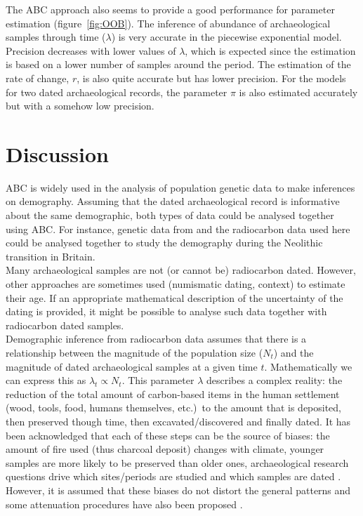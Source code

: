 \documentclass[a4paper]{article}
\begin{document}
The ABC approach also seems to provide a good performance for parameter estimation (figure~\ref{fig:OOB}). The inference of abundance of archaeological samples through time ($\lambda$) is very accurate in the piecewise exponential model. Precision decreases with lower values of $\lambda$, which is expected since the estimation is based on a lower number of samples around the period. The estimation of the rate of change, $r$, is also quite accurate but has lower precision. For the models for two dated archaeological records, the parameter $\pi$ is also estimated accurately but with a somehow low precision.
\\



\section*{\centering Discussion}




ABC is widely used in the analysis of population genetic data to make inferences on demography. Assuming that the dated archaeological record is informative about the same demographic, both types of data could be analysed together using ABC. For instance, genetic data from \parencite[][]{Patterson2022} and the radiocarbon data used here \parencite{Bevan2017a} could be analysed together to study the demography during the Neolithic transition in Britain. 
\\


Many archaeological samples are not (or cannot be) radiocarbon dated. However, other approaches are sometimes used (numismatic dating, context) to estimate their age. If an appropriate mathematical description of the uncertainty of the dating is provided, it might be possible to analyse such data together with radiocarbon dated samples.
\\


Demographic inference from radiocarbon data assumes that there is a relationship between the magnitude of the population size ($N_t$) and the magnitude of dated archaeological samples at a given time $t$. Mathematically we can express this as $\lambda_t \propto N_t$. This parameter $\lambda$ describes a complex reality: the reduction of the total amount of carbon-based items in the human settlement (wood, tools, food, humans themselves, etc.)\ to the amount that is deposited, then preserved though time, then excavated/discovered and finally dated. It has been acknowledged that each of these steps can be the source of biases: the amount of fire used (thus charcoal deposit) changes with climate, younger samples are more likely to be preserved than older ones, archaeological research questions drive which sites/periods are studied and which samples are dated \parencite{Rick1987,Williams2012}. However, it is assumed that these biases do not distort the general patterns and some attenuation procedures have also been proposed \textcite[\emph{e.g.}\ binning][]{Shennan2013}.
\\
\end{document}
